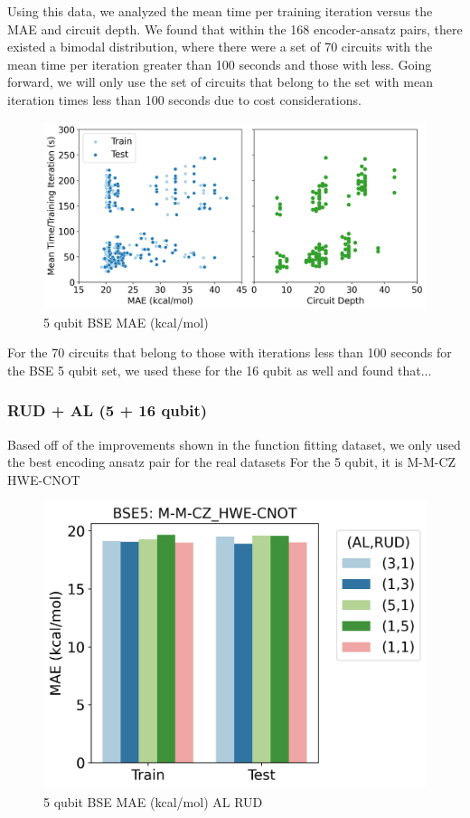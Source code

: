 \documentclass[journal=jacsat,manuscript=article]{achemso}
\begin{document}
Using this data, we analyzed the mean time per training iteration versus the MAE and circuit depth. 
We found that within the 168 encoder-ansatz pairs, there existed a bimodal distribution, where there were a set of 70 circuits with the mean time per iteration greater than 100 seconds and those with less.
Going forward, we will only use the set of circuits that belong to the set with mean iteration times less than 100 seconds due to cost considerations.
\begin{figure}[H]
	\centering
	\includegraphics[width=\textwidth]{images/BSE/AllBSE5_circuitdepth_MAE_vs_iterationtime.png}
	\caption{5 qubit BSE MAE (kcal/mol)}
	\label{fig:AllBSE5_circuitdepth_MAE_vs_iterationtime}
\end{figure}

For the 70 circuits that belong to those with iterations less than 100 seconds for the BSE 5 qubit set, we used these for the 16 qubit as well and found that...



\subsubsection{RUD + AL (5 + 16 qubit)}
Based off of the improvements shown in the function fitting dataset, we only used the best encoding ansatz pair for the real datasets
For the 5 qubit, it is  M-M-CZ HWE-CNOT

\begin{figure}[H]
	\centering
	\includegraphics[width=\textwidth]{images/BSE/BSE5_RUDAL.png}
	\caption{5 qubit BSE MAE (kcal/mol) AL RUD}
	\label{fig:	BSE5_RUDAL}
\end{figure}
\end{document}
